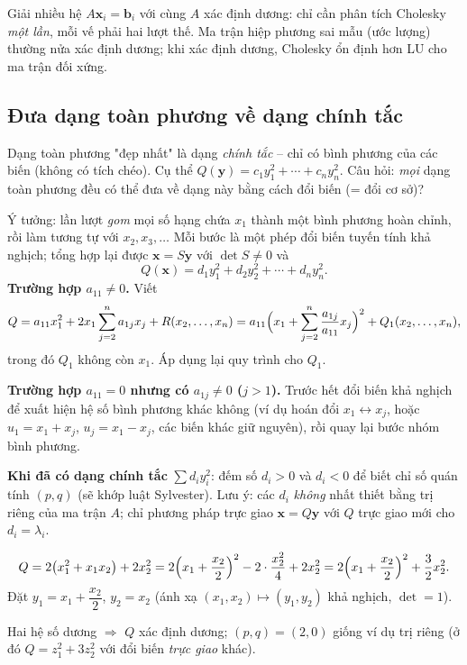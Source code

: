\documentclass[12pt,a4paper]{article}
\begin{document}
\begin{ungdung}
Giải nhiều hệ $A\mathbf{x}_i = \mathbf{b}_i$ với cùng $A$ xác định dương: chỉ cần phân tích Cholesky \emph{một lần}, mỗi vế phải hai lượt thế. Ma trận hiệp phương sai mẫu (ước lượng) thường nửa xác định dương; khi xác định dương, Cholesky ổn định hơn LU cho ma trận đối xứng.
\end{ungdung}

\subsection{Đưa dạng toàn phương về dạng chính tắc}

\begin{dongco}
Dạng toàn phương "đẹp nhất" là dạng \emph{chính tắc} -- chỉ có bình phương của các biến (không có tích chéo). Cụ thể $Q(\mathbf{y}) = c_1 y_1^2 + \cdots + c_n y_n^2$. Câu hỏi: \emph{mọi} dạng toàn phương đều có thể đưa về dạng này bằng cách đổi biến (= đổi cơ sở)?
\end{dongco}

\begin{phuongphap}[title={Phương pháp Lagrange (nhóm bình phương liên tiếp)}]
Ý tưởng: lần lượt \emph{gom} mọi số hạng chứa $x_1$ thành một bình phương hoàn chỉnh, rồi làm tương tự với $x_2, x_3, \ldots$ Mỗi bước là một phép đổi biến tuyến tính khả nghịch; tổng hợp lại được $\mathbf{x} = S\mathbf{y}$ với $\det S \ne 0$ và
\[
  Q(\mathbf{x}) = d_1 y_1^2 + d_2 y_2^2 + \cdots + d_n y_n^2.
\]
\textbf{Trường hợp $a_{11} \ne 0$.} Viết
\[
  Q = a_{11} x_1^2 + 2x_1 \sum_{j=2}^n a_{1j} x_j + R(x_2, \ldots, x_n)
  = a_{11}\Bigl(x_1 + \sum_{j=2}^n \dfrac{a_{1j}}{a_{11}} x_j\Bigr)^2 + Q_1(x_2, \ldots, x_n),
\]
trong đó $Q_1$ không còn $x_1$. Áp dụng lại quy trình cho $Q_1$.

\textbf{Trường hợp $a_{11} = 0$ nhưng có $a_{1j} \ne 0$ ($j > 1$).} Trước hết đổi biến khả nghịch để xuất hiện hệ số bình phương khác không (ví dụ hoán đổi $x_1 \leftrightarrow x_j$, hoặc $u_1 = x_1 + x_j$, $u_j = x_1 - x_j$, các biến khác giữ nguyên), rồi quay lại bước nhóm bình phương.

\textbf{Khi đã có dạng chính tắc} $\sum d_i y_i^2$: đếm số $d_i > 0$ và $d_i < 0$ để biết chỉ số quán tính $(p, q)$ (sẽ khớp luật Sylvester). Lưu ý: các $d_i$ \emph{không} nhất thiết bằng trị riêng của ma trận $A$; chỉ phương pháp trực giao $\mathbf{x} = Q\mathbf{y}$ với $Q$ trực giao mới cho $d_i = \lambda_i$.
\end{phuongphap}

\begin{vidu}[title={Lagrange cho $Q(x_1, x_2) = 2x_1^2 + 2x_1 x_2 + 2x_2^2$}]
\[
  Q = 2\bigl(x_1^2 + x_1 x_2\bigr) + 2x_2^2
  = 2\Bigl(x_1 + \dfrac{x_2}{2}\Bigr)^2 - 2\cdot\dfrac{x_2^2}{4} + 2x_2^2
  = 2\Bigl(x_1 + \dfrac{x_2}{2}\Bigr)^2 + \dfrac{3}{2} x_2^2.
\]
Đặt $y_1 = x_1 + \dfrac{x_2}{2}$, $y_2 = x_2$ (ánh xạ $(x_1, x_2) \mapsto (y_1, y_2)$ khả nghịch, $\det = 1$). 

Hai hệ số dương $\Rightarrow$ $Q$ xác định dương; $(p, q) = (2, 0)$ giống ví dụ trị riêng (ở đó $Q = z_1^2 + 3z_2^2$ với đổi biến \emph{trực giao} khác).
\end{vidu}
\end{document}
